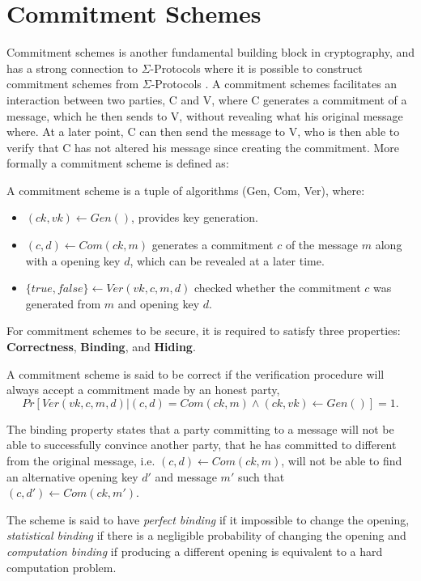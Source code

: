 \section{Commitment Schemes}
\label{sec:background:commitment}
Commitment schemes is another fundamental building block in cryptography, and
has a strong connection to $\Sigma$-Protocols where it is possible to construct
commitment schemes from $\Sigma$-Protocols \cite{cryptoeprint:2019:1185}. A commitment
schemes facilitates an interaction between two parties, C and V, where C
generates a commitment of a message, which he then sends to V, without revealing
what his original message where. At a later point, C can then send the message
to V, who is then able to verify that C has not altered his message since
creating the commitment. More formally a commitment scheme is defined as:

\begin{definition}
A commitment scheme is a tuple of algorithms (Gen, Com, Ver), where:
\begin{itemize}
  \item $(ck, vk) \leftarrow Gen()$, provides key generation.
  \item $(c, d) \leftarrow Com(ck, m)$ generates a commitment $c$ of the message
    $m$ along with a opening key $d$, which can be revealed at a later time.
  \item $\{true, false\} \leftarrow Ver(vk, c, m, d)$ checked whether the
    commitment $c$ was generated from $m$ and opening key $d$.
\end{itemize}
\end{definition}

For commitment schemes to be secure, it is required to satisfy three
properties: \textbf{Correctness}, \textbf{Binding}, and \textbf{Hiding}.

\begin{definition}
  A commitment scheme is said to be correct if
  the verification procedure  will always accept a commitment made by an honest party,
 \ie
$$
Pr[Ver(vk, c, m, d) | (c, d) = Com(ck, m) \land (ck, vk) \leftarrow Gen()] = 1.
$$
\end{definition}

\begin{definition}
The binding property states that a party committing to a message will not be
able to successfully convince another party, that he has committed to different
from the original message, i.e. $(c, d) \leftarrow Com(ck, m)$, will not be able
to find an alternative opening key $d'$ and message $m'$ such that
$(c, d') \leftarrow Com(ck, m')$.

The scheme is said to have \textit{perfect binding} if it impossible to change the
opening, \textit{statistical binding} if there is a negligible probability of changing
the opening and \textit{computation binding} if producing a different opening is
equivalent to a hard computation problem.
\end{definition}

